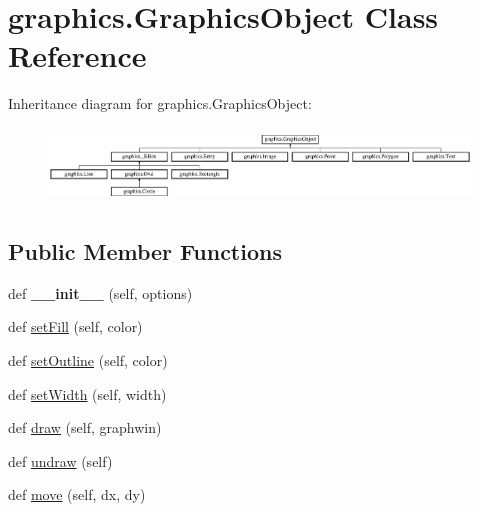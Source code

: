 \hypertarget{classgraphics_1_1_graphics_object}{}\section{graphics.\+Graphics\+Object Class Reference}
\label{classgraphics_1_1_graphics_object}
Inheritance diagram for graphics.\+Graphics\+Object\+:\begin{figure}[H]
\begin{center}
\leavevmode
\includegraphics[height=1.987578cm]{classgraphics_1_1_graphics_object}
\end{center}
\end{figure}
\subsection*{Public Member Functions}
\begin{DoxyCompactItemize}
\item 
\mbox{\label{classgraphics_1_1_graphics_object_a87c93d91bf82269f0b31c1e669b7ddf4}} 
def {\bfseries \+\_\+\+\_\+init\+\_\+\+\_\+} (self, options)
\item 
def \hyperlink{classgraphics_1_1_graphics_object_acfba33cbf63f5333f961b86e988fc292}{set\+Fill} (self, color)
\item 
def \hyperlink{classgraphics_1_1_graphics_object_a0acf1399e539cc273170096552a04139}{set\+Outline} (self, color)
\item 
def \hyperlink{classgraphics_1_1_graphics_object_a63006871dd6242bfc7aabe9ddcbb1263}{set\+Width} (self, width)
\item 
def \hyperlink{classgraphics_1_1_graphics_object_ac7849154dccab74cb76d2a28035db48c}{draw} (self, graphwin)
\item 
def \hyperlink{classgraphics_1_1_graphics_object_a7dc6432aa782c84f61407362e579aaf5}{undraw} (self)
\item 
def \hyperlink{classgraphics_1_1_graphics_object_a2dc26fc41e5fa51c7a97b592da2926e8}{move} (self, dx, dy)
\end{DoxyCompactItemize}
